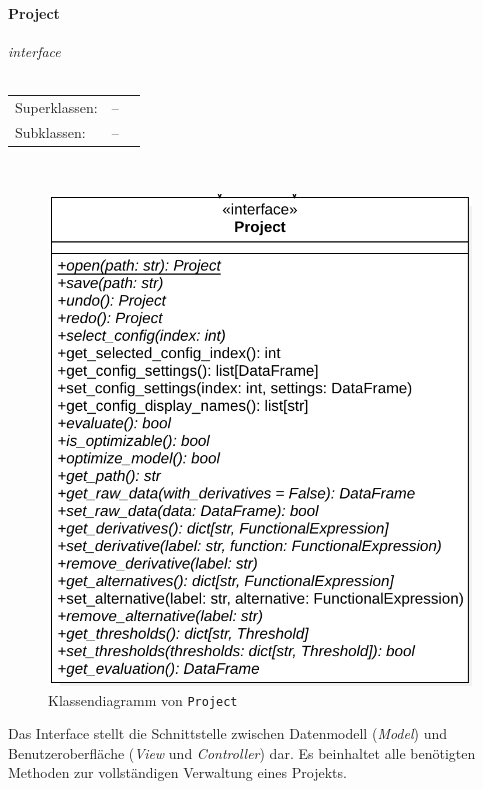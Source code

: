\documentclass{article}
\newcommand{\classheader}[2][]{\paragraph{#2}
\mbox{}\textit{#1}\\\\}
\begin{document}
\newpage
\classheader[\flqq{}interface\frqq]{Project}\label{cls:Project}
\begin{tabular}{lll}
 Superklassen: & --\\
 Subklassen: & --
\end{tabular}\\

\begin{figure}[H]%
    \centering
    \includegraphics[width=13cm]{entwurf/Entwurf_dokument/img/cls/model/Project.png}
    \caption{Klassendiagramm von \texttt{Project}}
\end{figure}

Das Interface stellt die Schnittstelle zwischen Datenmodell (\emph{Model}) und Benutzeroberfläche (\emph{View} und \emph{Controller}) dar. Es beinhaltet alle benötigten Methoden zur vollständigen Verwaltung eines Projekts.
\\\\
\end{document}
